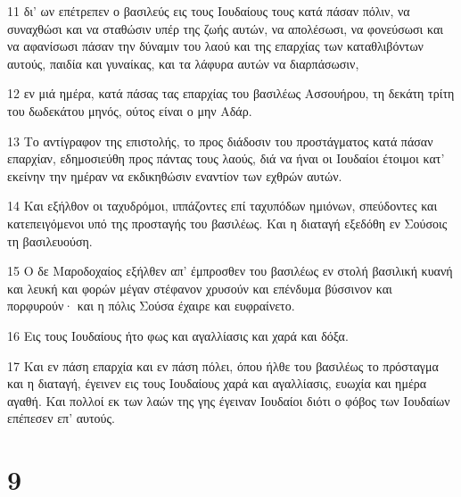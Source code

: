 \par 11 δι' ων επέτρεπεν ο βασιλεύς εις τους Ιουδαίους τους κατά πάσαν πόλιν, να συναχθώσι και να σταθώσιν υπέρ της ζωής αυτών, να απολέσωσι, να φονεύσωσι και να αφανίσωσι πάσαν την δύναμιν του λαού και της επαρχίας των καταθλιβόντων αυτούς, παιδία και γυναίκας, και τα λάφυρα αυτών να διαρπάσωσιν,
\par 12 εν μιά ημέρα, κατά πάσας τας επαρχίας του βασιλέως Ασσουήρου, τη δεκάτη τρίτη του δωδεκάτου μηνός, ούτος είναι ο μην Αδάρ.
\par 13 Το αντίγραφον της επιστολής, το προς διάδοσιν του προστάγματος κατά πάσαν επαρχίαν, εδημοσιεύθη προς πάντας τους λαούς, διά να ήναι οι Ιουδαίοι έτοιμοι κατ' εκείνην την ημέραν να εκδικηθώσιν εναντίον των εχθρών αυτών.
\par 14 Και εξήλθον οι ταχυδρόμοι, ιππάζοντες επί ταχυπόδων ημιόνων, σπεύδοντες και κατεπειγόμενοι υπό της προσταγής του βασιλέως. Και η διαταγή εξεδόθη εν Σούσοις τη βασιλευούση.
\par 15 Ο δε Μαροδοχαίος εξήλθεν απ' έμπροσθεν του βασιλέως εν στολή βασιλική κυανή και λευκή και φορών μέγαν στέφανον χρυσούν και επένδυμα βύσσινον και πορφυρούν· και η πόλις Σούσα έχαιρε και ευφραίνετο.
\par 16 Εις τους Ιουδαίους ήτο φως και αγαλλίασις και χαρά και δόξα.
\par 17 Και εν πάση επαρχία και εν πάση πόλει, όπου ήλθε του βασιλέως το πρόσταγμα και η διαταγή, έγεινεν εις τους Ιουδαίους χαρά και αγαλλίασις, ευωχία και ημέρα αγαθή. Και πολλοί εκ των λαών της γης έγειναν Ιουδαίοι διότι ο φόβος των Ιουδαίων επέπεσεν επ' αυτούς.

\chapter{9}


